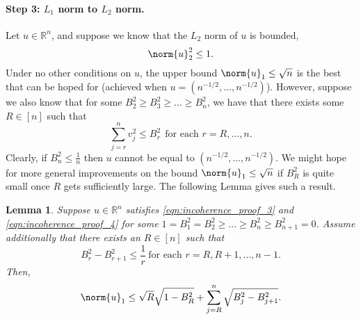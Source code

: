 \documentclass{article}
\newcommand{\Reals}{\mathbb{R}}
\newcommand{\1}{\mathbf{1}}
\theoremstyle{alden}
\theoremstyle{aldenthm}
\newtheorem{lemma}{Lemma}
\theoremstyle{definition}
\theoremstyle{remark}
\begin{document}
\paragraph{Step 3: $L_1$ norm to $L_2$ norm.}

Let $u \in \Reals^n$, and suppose we know that the $L_2$ norm of $u$ is bounded,
\begin{equation}
\label{eqn:incoherence_proof_3}
\norm{u}_2^2 \leq 1.
\end{equation}
Under no other conditions on $u$, the upper bound $\norm{u}_1 \leq \sqrt{n}$ is the best that can be hoped for (achieved when $u = (n^{-1/2},\ldots,n^{-1/2})$). However, suppose we also know that for some $B_2^2 \geq B_3^2 \geq \ldots \geq B_n^2$, we have that there exists some $R \in [n]$ such that
\begin{equation}
\label{eqn:incoherence_proof_4}
\sum_{j = r}^{n} v_j^2 \leq B_r^2 ~~\textrm{for each $r = R,\ldots,n$.}
\end{equation}
Clearly, if $B_n^2 \leq \frac{1}{n}$ then $u$ cannot be equal to $(n^{-1/2},\ldots,n^{-1/2})$. We might hope for more general improvements on the bound $\norm{u}_1 \leq \sqrt{n}$ if $B_R^2$ is quite small once $R$ gets sufficiently large. The following Lemma gives such a result.
\begin{lemma}
	\label{lem:pi_max_pf_1_util_1}
	Suppose $u \in \Reals^n$ satisfies \eqref{eqn:incoherence_proof_3} and \eqref{eqn:incoherence_proof_4} for some $1 = B_1^2 = B_2^2 \geq \ldots \geq B_n^2 \geq B_{n+1}^2 = 0$. Assume additionally that there exists an $R \in [n]$ such that
	\begin{equation}
	\label{eqn:incoherence_util_1}
	B_r^2 - B_{r + 1}^2 \leq \frac{1}{r}~\textrm{for each $r = R, R+1,\ldots, n - 1$.}
	\end{equation}
	Then,
	\begin{equation}
	\label{eqn:incoherence_util_2}
	\norm{u}_1 \leq \sqrt{R}\sqrt{1 - B_R^2} + \sum_{j = R}^{n} \sqrt{B_j^2 - B_{j+1}^2}.
	\end{equation}
\end{lemma}
\end{document}
